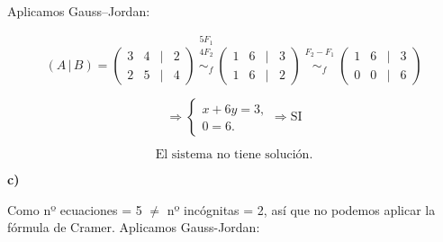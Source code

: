 \documentclass[a4paper,12pt]{article}
\begin{document}
\begin{ejercicio}[title=Ejercicio 26]
Aplicamos Gauss–Jordan:

\[
(A\,|\,B)=
\begin{pmatrix}
3 & 4 &\Big|& 2\\
2 & 5 &\Big|& 4
\end{pmatrix}
\overset{\substack{5F_1\\4F_2\\{}}}{\sim_f}
\begin{pmatrix}
1 & 6 &\Big|& 3\\
1 & 6 &\Big|& 2
\end{pmatrix}
\overset{\substack{F_2 - F_1\\{}}}{\sim_f}
\begin{pmatrix}
1 & 6 &\Big|& 3\\
0 & 0 &\Big|& 6
\end{pmatrix}
\]

\[
\Rightarrow
\begin{cases}
x + 6y = 3,\\[4pt]
0 = 6.
\end{cases}
\Rightarrow
\text{SI}
\]

\[
\boxed{\text{El sistema no tiene solución.}}
\]

\bigskip

\textbf{c)}

Como nº ecuaciones = 5 $\ne$ nº incógnitas = 2, así que no podemos aplicar la fórmula de Cramer. Aplicamos Gauss-Jordan:


\end{ejercicio}
\end{document}
